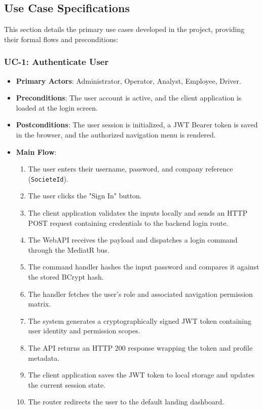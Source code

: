 \subsection{Use Case Specifications}

This section details the primary use cases developed in the project, providing their formal flows and preconditions:

\subsubsection{UC-1: Authenticate User}
\begin{itemize}
  \item \textbf{Primary Actors}: Administrator, Operator, Analyst, Employee, Driver.
  \item \textbf{Preconditions}: The user account is active, and the client application is loaded at the login screen.
  \item \textbf{Postconditions}: The user session is initialized, a JWT Bearer token is saved in the browser, and the authorized navigation menu is rendered.
  \item \textbf{Main Flow}:
  \begin{enumerate}
    \item The user enters their username, password, and company reference (\texttt{SocieteId}).
    \item The user clicks the "Sign In" button.
    \item The client application validates the inputs locally and sends an HTTP POST request containing credentials to the backend login route.
    \item The WebAPI receives the payload and dispatches a login command through the MediatR bus.
    \item The command handler hashes the input password and compares it against the stored BCrypt hash.
    \item The handler fetches the user's role and associated navigation permission matrix.
    \item The system generates a cryptographically signed JWT token containing user identity and permission scopes.
    \item The API returns an HTTP 200 response wrapping the token and profile metadata.
    \item The client application saves the JWT token to local storage and updates the current session state.
    \item The router redirects the user to the default landing dashboard.

\end{enumerate}
\end{itemize}
